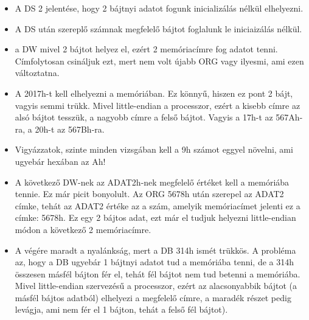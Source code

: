 \documentclass{article}
\begin{document}
\begin{itemize}
	\item A DS 2 jelentése, hogy 2 bájtnyi adatot fogunk inicializálás nélkül elhelyezni.
	\item \colorbox{orange!30}{A DS után szereplő számnak megfelelő bájtot foglalunk le iniciaizálás nélkül.}
	\item a DW mivel 2 bájtot helyez el, ezért 2 memóriacímre fog adatot tenni. Címfolytosan csináljuk ezt, mert nem volt újabb ORG vagy ilyesmi, ami ezen változtatna.
	\item A 2017h-t kell elhelyezni a memóriában. Ez könnyű, hiszen ez pont 2 bájt, vagyis semmi trükk. Mivel little-endian a processzor, ezért a kisebb címre az alsó bájtot tesszük, a nagyobb címre a felső bájtot. Vagyis a 17h-t az 567Ah-ra, a 20h-t az 567Bh-ra.
	\item \colorbox{orange!30}{Vigyázzatok, szinte minden vizsgában kell a 9h számot eggyel növelni, ami ugyebár hexában az Ah!}
	\item A következő DW-nek az ADAT2h-nek megfelelő értéket kell a memóriába tennie. Ez már picit bonyolult. Az ORG 5678h után szerepel az ADAT2 címke, tehát az ADAT2 értéke az a szám, amelyik memóriacímet jelenti ez a címke: 5678h. Ez egy 2 bájtos adat, ezt már el tudjuk helyezni little-endian módon a következő 2 memóriacímre.
	\item A végére maradt a nyalánkság, mert a DB 314h ismét trükkös. A probléma az, hogy a DB ugyebár 1 bájtnyi adatot tud a memóriába tenni, de a 314h összesen másfél bájton fér el, tehát fél bájtot nem tud betenni a memóriába. Mivel little-endian szervezésű a processzor, ezért az alacsonyabbik bájtot (a másfél bájtos adatból) elhelyezi a megfelelő címre, a maradék részet pedig levágja, ami nem fér el 1 bájton, tehát a felső fél bájtot).
\end{itemize}
\end{document}
